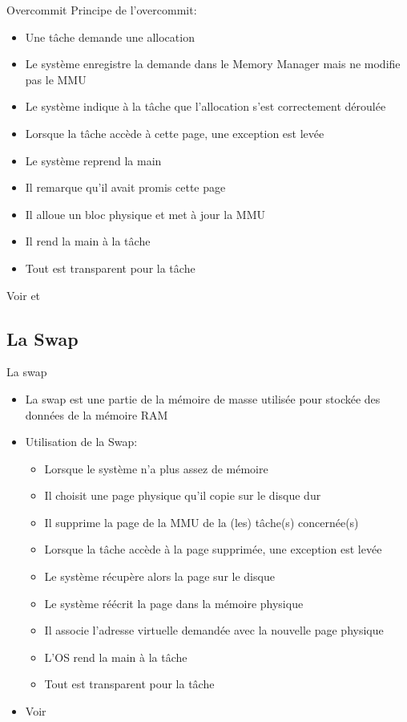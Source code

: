 \begin{frame}{Overcommit}
  Principe de l'overcommit:
  \begin{itemize}
  \item Une tâche demande une allocation
  \item Le système  enregistre la demande dans le  Memory Manager mais
    ne modifie pas le MMU
  \item  Le  système  indique   à  la  tâche  que  l'allocation  s'est
    correctement déroulée
  \item Lorsque la tâche accède à cette page, une exception est levée
  \item Le système reprend la main
  \item Il remarque qu'il avait promis cette page
  \item Il alloue un bloc physique et met à jour la MMU
  \item Il rend la main à la tâche
  \item Tout est transparent pour la tâche
  \end{itemize}
  Voir                         et
\end{frame}

\subsection{La Swap}

\begin{frame}{La swap}
  \begin{itemize}
  \item La  swap est une partie  de la mémoire de  masse utilisée pour
    stockée des données de la mémoire RAM
  \item Utilisation de la Swap:
  \begin{itemize}
  \item Lorsque le système n'a plus assez de mémoire
  \item Il choisit une page physique qu'il copie sur le disque dur
  \item  Il  supprime  la  page   de  la  MMU  de  la  (les)  tâche(s)
    concernée(s)
  \item Lorsque la tâche accède à la page supprimée, une exception est
    levée
  \item Le système récupère alors la page sur le disque
  \item Le système réécrit la page dans la mémoire physique
  \item Il associe l'adresse virtuelle demandée avec la nouvelle page
    physique
  \item L'OS rend la main à la tâche
  \item Tout est transparent pour la tâche
  \end{itemize}
\item Voir 
\end{itemize}
\end{frame}

